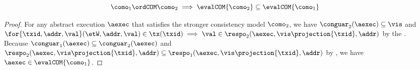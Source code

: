 \begin{lem}
\label{lem:consistency-include}
\label{lem:consistency-monotonicity}
\[
    \como_{1} \ordCOM \como_{2} \implies \evalCOM{\como_{2}} \subseteq \evalCOM{\como_{1}}
\]
\end{lem}
\begin{proof}
For any abstract execution \( \aexec \) that satisfies the stronger consistency model \( \como_{2} \), we have \( \conguar_{2}(\aexec) \subseteq \vis  \) and \( \for{\txid, \addr, \val} (\etW, \addr, \val) \in \tx(\txid) \implies \val \in \respo_{2}(\aexec, \vis\projection{\txid}, \addr) \) by the .
Because \( \conguar_{1}(\aexec)  \subseteq \conguar_{2}(\aexec)  \)  and \( \respo_{2}(\aexec, \vis\projection{\txid}, \addr) \subseteq \respo_{1}(\aexec, \vis\projection{\txid}, \addr)\) by , we have \( \aexec \in \evalCOM{\como_{1}}\).
\end{proof}

